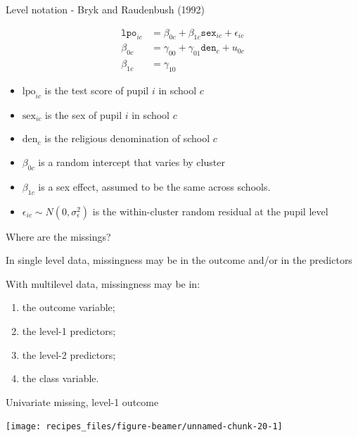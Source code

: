 \documentclass[ignorenonframetext,aspectratio=43]{beamer}
\providecommand{\tightlist}{%
  \setlength{\itemsep}{0pt}\setlength{\parskip}{0pt}}
\begin{document}
\begin{frame}{Level notation - Bryk and Raudenbush (1992)}

\begin{align}
{{\texttt{lpo}}}_{ic} & = \beta_{0c} + \beta_{1c}{{\texttt{sex}}}_{ic} + \epsilon_{ic}\\
\beta_{0c}     & = \gamma_{00} + \gamma_{01}{{\texttt{den}}}_{c} + u_{0c}\\
\beta_{1c}     & = \gamma_{10}
\end{align}

\begin{itemize}
\tightlist
\item
  \(\text{lpo}_{ic}\) is the test score of pupil \(i\) in school \(c\)
\item
  \(\text{sex}_{ic}\) is the sex of pupil \(i\) in school \(c\)
\item
  \(\text{den}_c\) is the religious denomination of school \(c\)
\item
  \(\beta_{0c}\) is a random intercept that varies by cluster
\item
  \(\beta_{1c}\) is a sex effect, assumed to be the same across schools.
\item
  \(\epsilon_{ic} \sim N(0, \sigma_\epsilon^2)\) is the within-cluster
  random residual at the pupil level
\end{itemize}

\end{frame}

\begin{frame}{Where are the missings?}

In single level data, missingness may be in the outcome and/or in the
predictors

With multilevel data, missingness may be in:

\begin{enumerate}
\def\labelenumi{\arabic{enumi}.}
\item
  the outcome variable;
\item
  the level-1 predictors;
\item
  the level-2 predictors;
\item
  the class variable.
\end{enumerate}

\end{frame}

\begin{frame}{Univariate missing, level-1 outcome}

\begin{center}\texttt{[image: recipes\_files/figure-beamer/unnamed-chunk-20-1]} \end{center}

\end{frame}
\end{document}

